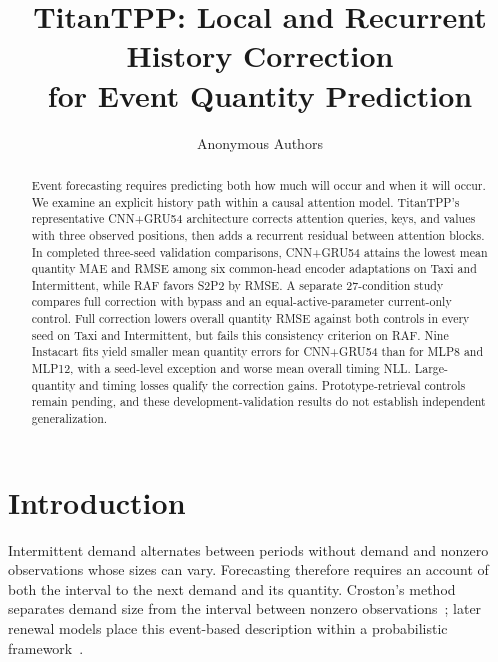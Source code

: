 \documentclass[runningheads]{llncs}
\begin{document}
\title{TitanTPP: Local and Recurrent History Correction\texorpdfstring{\\}{ }for Event Quantity Prediction}
\author{Anonymous Authors}
\maketitle

\begin{abstract}
Event forecasting requires predicting both how much will occur and when it will occur.
We examine an explicit history path within a causal attention model.
TitanTPP's representative CNN+GRU54 architecture corrects attention queries, keys, and values with three observed positions, then adds a recurrent residual between attention blocks.
In completed three-seed validation comparisons, CNN+GRU54 attains the lowest mean quantity MAE and RMSE among six common-head encoder adaptations on Taxi and Intermittent, while RAF favors S2P2 by RMSE.
A separate 27-condition study compares full correction with bypass and an equal-active-parameter current-only control.
Full correction lowers overall quantity RMSE against both controls in every seed on Taxi and Intermittent, but fails this consistency criterion on RAF.
Nine Instacart fits yield smaller mean quantity errors for CNN+GRU54 than for MLP8 and MLP12, with a seed-level exception and worse mean overall timing NLL.
Large-quantity and timing losses qualify the correction gains. Prototype-retrieval controls remain pending, and these development-validation results do not establish independent generalization.
\end{abstract}

\section{Introduction}
Intermittent demand alternates between periods without demand and nonzero observations whose sizes can vary. Forecasting therefore requires an account of both the interval to the next demand and its quantity. Croston's method separates demand size from the interval between nonzero observations~\cite{croston1972forecasting}; later renewal models place this event-based description within a probabilistic framework~\cite{turkmen2021renewal}.
\end{document}
